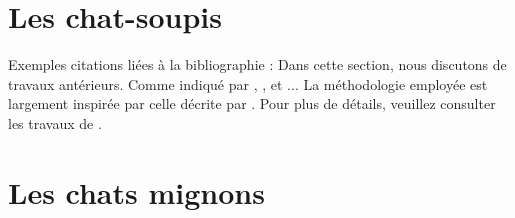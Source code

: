 \documentclass{report}
\begin{document}
\section{Les chat-soupis}


\lipsum[100]

\par %
\bigskip %
\noindent %
Exemples citations liées à la bibliographie : Dans cette section, nous discutons de travaux antérieurs. Comme indiqué par \cite{smith2023}, \cite{johnson2024}, et \cite{doe2025}... La méthodologie employée est largement inspirée par celle décrite par \cite{johnson2024}. Pour plus de détails, veuillez consulter les travaux de \cite{doe2025}.

\newpage %

\section{Les chats mignons}
\end{document}
